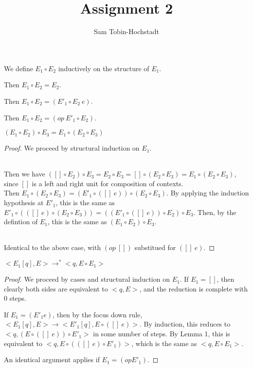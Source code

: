 \documentclass{article}
\begin{document}
\title{Assignment 2}
\author{Sam Tobin-Hochstadt}

\maketitle

\begin{define}
We define $E_1 \circ E_2$ inductively on the structure of $E_1$.
\end{define}

\begin{enumerate}
 Then $E_1 \circ E_2 = E_2$.  \vspace{2mm}

 Then $E_1 \circ E_2 = (E'_1 \circ E_2\
e)$. \vspace{2mm}

 Then $E_1 \circ E_2 = (op\ E'_1 \circ
E_2)$. \vspace{2mm}

\end{enumerate}

\begin{lemma}
$(E_1 \circ E_2) \circ E_3 = E_1 \circ (E_2 \circ E_3)$
\end{lemma}

\begin{proof}
We proceed by structural induction on $E_1$.

 \ \\
Then we have $([] \circ E_2) \circ E_3 = E_2 \circ E_3 = [] \circ (E_2
\circ E_3) = E_1 \circ (E_2 \circ E_3)$, since $[]$ is a left and
right unit for composition of contexts.
\ \\
Then $ E_1 \circ (E_2 \circ E_3) = (E'_1 \circ ([]\ e)) \circ (E_2
\circ E_3)$. By applying the induction hypothesis at $E'_1$, this is
the same as $E'_1 \circ (([]\ e) \circ (E_2 \circ E_3)) = ((E'_1 \circ
([]\ e)) \circ E_2) \circ E_3$.  Then, by the defintion of $E_1$, this
is the same as $(E_1 \circ E_2) \circ E_3$.  


\ \\ Identical to the
above case, with $(op\ [])$ substitued for $([]\ e)$.
\end{proof}

\begin{theorem}
  $<E_1[q], E> \rightarrow^* <q,E \circ E_1>$
\end{theorem}

\begin{proof}
  We proceed by cases and structural induction on $E_1$.  If $E_1 =
  []$, then clearly both sides are equivalent to $<q,E>$, and the
  reduction is complete with 0 steps.  

  If $E_1 = (E'_1 e)$, then by the focus down rule, $<E_1[q], E>
  \rightarrow <E'_1[q], E \circ ([]\ e)>$. By induction, this reduces
  to $<q,(E \circ ([]\ e)) \circ E'_1>$ in some number of steps.  By
  Lemma 1, this is equivalent to $<q,E \circ (([]\ e) \circ E'_1)>$,
  which is the same as $<q,E \circ E_1>$.

  An identical argument applies if $E_1 = (op E'_1)$.
\end{proof}
\end{document}
